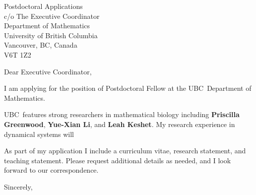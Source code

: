 \documentclass[11pt,a4paper]{letter}
\begin{document}
\def\School{UBC}
\begin{letter}
{Postdoctoral Applications\\
c/o The Executive Coordinator\\
Department of Mathematics\\
University of British Columbia\\
Vancouver, BC, Canada\\
V6T 1Z2}


\opening{Dear Executive Coordinator,}

I am applying for the position of Postdoctoral Fellow  at the \School~Department of Mathematics. 



\School~features strong researchers in mathematical biology including \textbf{Priscilla Greenwood}, \textbf{Yue-Xian Li}, and \textbf{Leah Keshet}. My research experience in dynamical systems will 



As part of my application I include a curriculum vitae, research statement, and teaching statement. Please request additional details as needed, and I look forward to our correspondence.

\closing{Sincerely,}
\end{letter}
\end{document}
